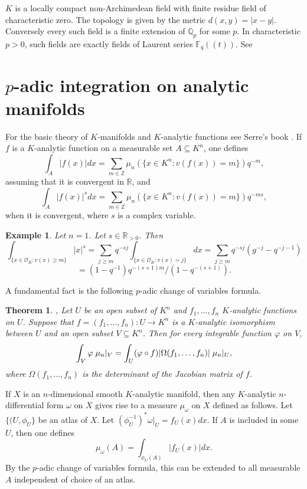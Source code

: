 \documentclass[12pt]{amsart}
\def\R{\mathbb{R}}
\def\F{\mathbb{F}}
\def\Z{\mathbb{Z}}
\def\R{\mathbb{R}}
\def\Q{\mathbb{Q}}
\def\F{\mathbb{F}}
\def\cO{\mathcal{O}}
\newtheorem{thm}{Theorem}[section]
\newtheorem{ex}{Example}[section]
\numberwithin{equation}{section}
\begin{document}
$K$ is a locally compact non-Archimedean field with finite residue field of characteristic zero. The topology is given by the metric $d(x,y)=|x-y|$. Conversely every such field is a finite extension of $\Q_p$ for some $p$. In characteristic $p>0$, such fields are exactly fields of Laurent series $\F_q((t))$. See \cite{ramak}

\section{\bf $p$-adic integration on analytic manifolds}

For the basic theory of $K$-manifolds and $K$-analytic functions see Serre's book \cite{serre-LGLA}.  If $f$ is a $K$-analytic function on a measurable set $A\subseteq K^n$, one defines
$$\int_{A}|f(x)|dx=\sum_{m\in \Z} \mu_n(\{x\in K^n: v(f(x))=m\})q^{-m},$$
assuming that it is convergent in $\R$, and 
$$\int_{A}|f(x)|^s dx=\sum_{m\in \Z} \mu_n(\{x\in K^n: v(f(x))=m\})q^{-ms},$$
when it is convergent, where $s$ is a complex variable.

\begin{ex} Let $n=1$. Let $s\in \R_{>0}$. Then
$$\int_{\{x\in \cO_K: v(x)\geq m\}} |x|^s=\sum_{j\geq m} q^{-sj} \int_{\{x\in \cO_K: v(x)=j\}} dx=\sum_{j\geq m} q^{-sj}(g^{-j}-q^{-j-1})$$
$$=(1-q^{-1})q^{-(s+1)m}/(1-q^{-(s+1)}).$$
\end{ex}
A fundamental fact is the following $p$-adic change of variables formula. 
\begin{thm}\cite{weil-adeles-gps},\cite{igusa-book} Let $U$ be an open subset of $K^n$ and $f_1,\dots,f_n$ $K$-analytic functions on $U$. Suppose that $f=(f_1,\dots,f_n): U\rightarrow K^n$ is a $K$-analytic isomorphism between $U$ and an open subset 
$V\subseteq K^n$. Then for every integrable function $\varphi$ on $V$,
$$\int_V \varphi \hspace{0.1cm} \mu_n|_{V}=\int_U (\varphi \circ f) |\Omega(f_1,\dots,f_n)| \hspace{0.1cm} \mu_n|_{U},$$
where $\Omega(f_1,\dots,f_n)$ is the determinant of the Jacobian matrix of $f$.\end{thm}
If $X$ is an $n$-dimensional smooth $K$-analytic manifold, then any $K$-analytic $n$-differential form $\omega$ on $X$ gives rise to a measure $\mu_{\omega}$ on $X$ defined as follows. Let $\{(U,\phi_U\}$ be an atlas of $X$. Let 
$(\phi_U^{-1})^*\omega|_{U}=f_U(x) dx$. If $A$ is included in some $U$, then one defines
$$\mu_{\omega}(A)=\int_{\phi_U(A)}|f_U(x)|dx.$$
By the $p$-adic change of variables formula, this can be extended to all measurable $A$ independent of choice of 
an atlas.
\end{document}
